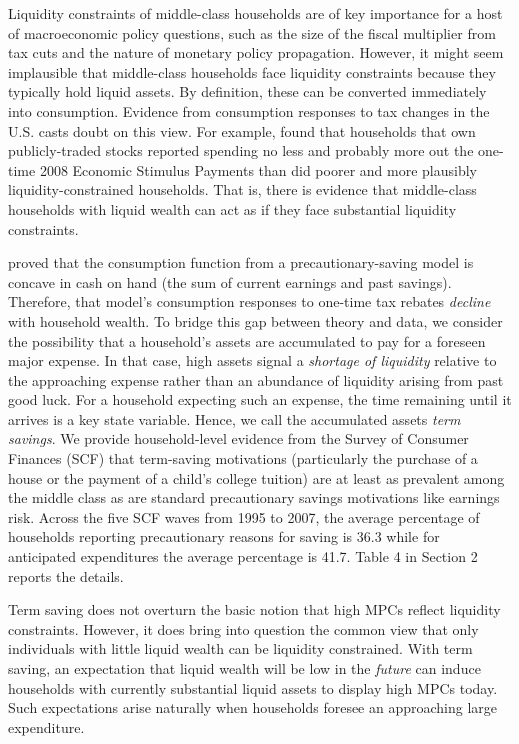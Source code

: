 \documentclass[fleqccn,12pt]{article}
\begin{document}
Liquidity constraints of middle-class households are of key importance for a host of macroeconomic policy questions, such as the size of the fiscal multiplier from tax cuts and the nature of monetary policy propagation. However, it might seem implausible that middle-class households face liquidity constraints because they typically hold liquid assets. By definition, these can be converted immediately into consumption. Evidence from consumption responses to tax changes in the U.S. casts doubt on this view. For example, \citet*{taxPolicy2010SahmShapiroSlemrod} found that households that own publicly-traded stocks reported spending no less and probably more out the one-time 2008 Economic Stimulus Payments than did poorer and more plausibly liquidity-constrained households. That is, there is evidence that middle-class households with liquid wealth can act as if they face substantial liquidity constraints.

 \cite{ecta1996CarrollKimball} proved that the consumption function from a precautionary-saving model is concave in cash on hand (the sum of current earnings and past savings). Therefore, that model's consumption responses to one-time tax rebates \emph{decline} with household wealth. To bridge this gap between theory and data, we consider the possibility that a household's assets are accumulated to pay for a foreseen major expense. In that case, high assets signal a \emph{shortage of liquidity} relative to the approaching expense rather than an abundance of liquidity arising from past good luck. For a household expecting such an expense, the time remaining until it arrives is a key state variable. Hence, we call the accumulated assets \emph{term savings}.  We provide household-level evidence from the Survey of Consumer Finances (SCF) that term-saving motivations (particularly the purchase of a house or the payment of a child's college tuition) are at least as prevalent among the middle class as are standard precautionary savings motivations like earnings risk. Across the five SCF waves from 1995 to 2007, the average percentage of households reporting precautionary reasons for saving is 36.3 while for anticipated expenditures the average percentage is 41.7. Table 4 in Section 2 reports the details.
 
Term saving does not overturn the basic notion that high MPCs reflect liquidity constraints. However, it does bring into question the common view that only individuals with little liquid wealth can be liquidity constrained. With term saving, an expectation that liquid wealth will be low in the \emph{future} can induce households with currently substantial liquid assets to display high MPCs today. Such expectations arise naturally when households foresee an approaching large expenditure.
\end{document}
